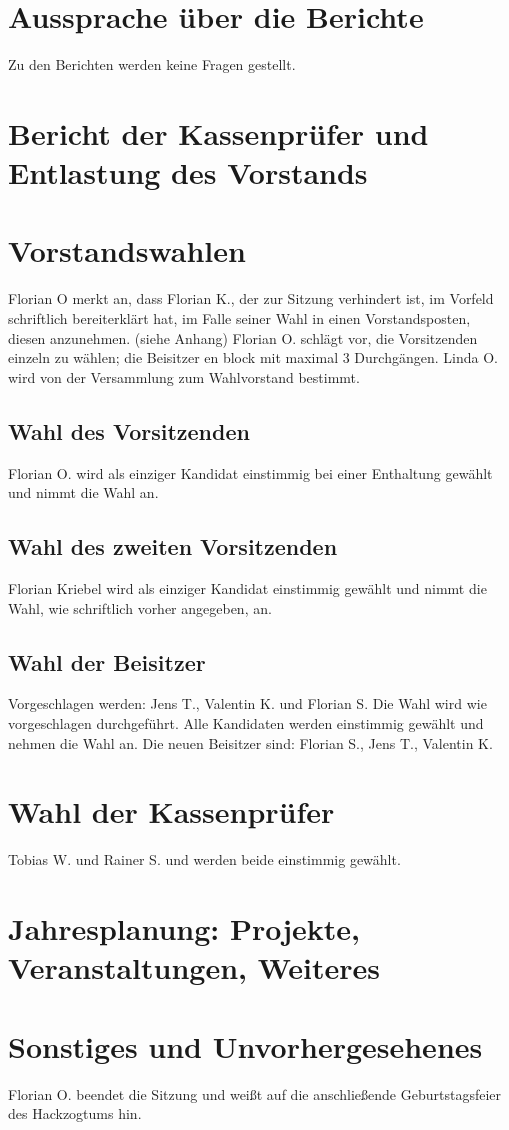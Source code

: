 \section{Aussprache über die Berichte}
Zu den Berichten werden keine Fragen gestellt.

\section{Bericht der Kassenprüfer und Entlastung des Vorstands}

\section{Vorstandswahlen}
 Florian O merkt an, dass Florian K., der zur Sitzung verhindert ist, im Vorfeld schriftlich bereiterklärt hat, im Falle seiner Wahl in einen Vorstandsposten, diesen anzunehmen. (siehe Anhang)
 Florian O. schlägt vor, die Vorsitzenden einzeln zu wählen; die Beisitzer en block mit maximal 3 Durchgängen.
 Linda O. wird von der Versammlung zum Wahlvorstand bestimmt.
\subsection{Wahl des Vorsitzenden}
 Florian O. wird als einziger Kandidat einstimmig bei einer Enthaltung gewählt und nimmt die Wahl an. 
\subsection{Wahl des zweiten Vorsitzenden}         
 Florian Kriebel wird als einziger Kandidat einstimmig gewählt und nimmt die Wahl, wie schriftlich vorher angegeben, an. 
\subsection{Wahl der Beisitzer}
  Vorgeschlagen werden: Jens T., Valentin K. und Florian S.
  Die Wahl wird wie vorgeschlagen durchgeführt. 
  Alle Kandidaten werden einstimmig gewählt und nehmen die Wahl an. 
  Die neuen Beisitzer sind: Florian S., Jens T., Valentin K.

\section{Wahl der Kassenprüfer}
 Tobias W. und Rainer S. und werden beide einstimmig gewählt. 
 
\section{Jahresplanung:   Projekte,   Veranstaltungen, Weiteres}
 
\section{Sonstiges und Unvorhergesehenes}
 Florian O. beendet die Sitzung und weißt auf die anschließende Geburtstagsfeier des Hackzogtums hin. 

